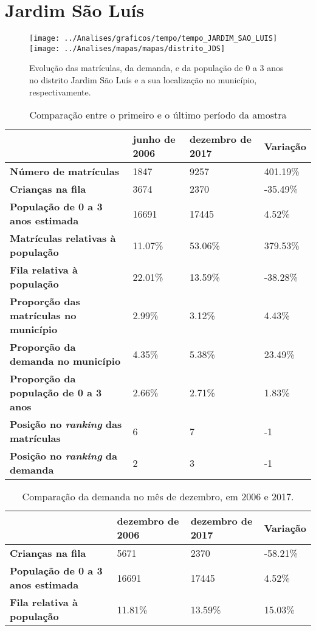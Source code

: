 \section{Jardim São Luís}
\begin{figure}[H]
	\centering
	\texttt{[image: ../Analises/graficos/tempo/tempo\_JARDIM\_SAO\_LUIS]}
	\texttt{[image: ../Analises/mapas/mapas/distrito\_JDS]}
	\caption{Evolução das matrículas, da demanda, e da população de 0 a 3 anos no distrito Jardim São Luís e a sua localização no município, respectivamente.}
\end{figure}
\begin{table}[H]
	\begin{tabular}{|l|l|l|l|}
		\hline
		\textbf{}                                      & \textbf{junho de 2006}       & \textbf{dezembro de 2017}    & \textbf{Variação} \\ \hline
		\textbf{Número de matrículas}                  & 1847 & 9257 & 401.19\% \\ \hline
		\textbf{Crianças na fila}                      & 3674 & 2370 & -35.49\% \\ \hline
		\textbf{População de 0 a 3 anos estimada}      & 16691 & 17445 & 4.52\% \\ \hline
		\textbf{Matrículas relativas à população}      & 11.07\% & 53.06\% & 379.53\% \\ \hline
		\textbf{Fila relativa à população}             & 22.01\% & 13.59\% & -38.28\% \\ \hline
		\textbf{Proporção das matrículas no município} & 2.99\% & 3.12\% & 4.43\% \\ \hline
		\textbf{Proporção da demanda no município}     & 4.35\% & 5.38\% & 23.49\% \\ \hline
		\textbf{Proporção da população de 0 a 3 anos}  & 2.66\% & 2.71\% & 1.83\% \\ \hline
		\textbf{Posição no \textit{ranking} das matrículas}     & 6 & 7 & -1 \\ \hline
		\textbf{Posição no \textit{ranking} da demanda}         & 2 & 3 & -1 \\ \hline
	\end{tabular}
	\caption{Comparação entre o primeiro e o último período da amostra}
\end{table}
\begin{table}[H]
	\begin{tabular}{|l|l|l|l|}
		\hline
		\textbf{}                                 & \textbf{dezembro de 2006} & \textbf{dezembro de 2017} & \textbf{Variação} \\ \hline
		\textbf{Crianças na fila}                      & 5671 & 2370 & -58.21\% \\ \hline
		\textbf{População de 0 a 3 anos estimada}      & 16691 & 17445 & 4.52\% \\ \hline
		\textbf{Fila relativa à população}             & 11.81\% & 13.59\% & 15.03\% \\ \hline
	\end{tabular}
	\caption{Comparação da demanda no mês de dezembro, em 2006 e 2017.}
\end{table}
